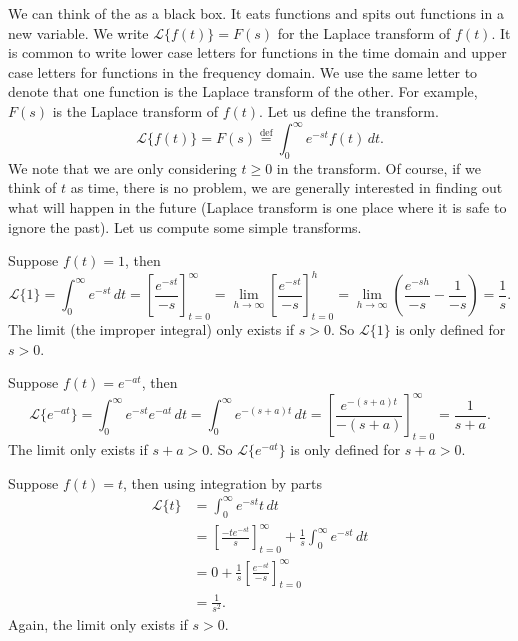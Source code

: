 We can think of the \emph{} as a black box.  It
eats functions and spits out functions in a new variable.  We write
$\mathcal{L} \bigl\{ f(t) \bigr\} = F(s)$ for the Laplace transform of $f(t)$.
It is common to write lower case letters for
functions in the time domain and upper case letters for functions in the
frequency domain.  We use the same letter to denote that one function
is the Laplace transform of the other.  For example, $F(s)$ is the Laplace
transform of $f(t)$.  Let us define the transform.
\begin{equation*}
\mathcal{L} \bigl\{ f(t) \bigr\} =
F(s) \overset{\text{def}}{=} \int_0^\infty e^{-st} f(t) \, dt .
\end{equation*}
We note that we are only considering $t \geq 0$ in the transform.  Of course,
if we think of $t$ as time, there is no problem, we are generally interested in
finding out what will happen in the future (Laplace transform is one place
where it is safe to ignore the past).  Let us compute some simple
transforms.

\begin{example}
Suppose $f(t) = 1$, then
\begin{equation*}
\mathcal{L} \{1\} = \int_0^\infty e^{-st} \, dt
=
\left[ \frac{e^{-st}}{-s} \right]_{t=0}^\infty
=
\lim_{h\to\infty}
\left[ \frac{e^{-st}}{-s} \right]_{t=0}^h
=
\lim_{h\to\infty}
\left( \frac{e^{-sh}}{-s} - \frac{1}{-s} \right)
= \frac{1}{s} .
\end{equation*}
The limit (the improper integral) only exists if $s > 0$.  So 
$\mathcal{L} \{1\}$ is only defined for $s > 0$.
\end{example}

\begin{example}
Suppose $f(t) = e^{-at}$, then
\begin{equation*}
\mathcal{L} \bigl\{e^{-at}\bigr\}
= \int_0^\infty e^{-st} e^{-at} \, dt
= \int_0^\infty e^{-(s+a)t} \, dt
=
\left[ \frac{e^{-(s+a)t}}{-(s+a)} \right]_{t=0}^\infty
= \frac{1}{s+a} .
\end{equation*}
The limit only exists if $s+a > 0$.  So 
$\mathcal{L} \bigl\{e^{-at}\bigr\}$ is only defined for $s+a > 0$.
\end{example}

\begin{example}
Suppose $f(t) = t$, then using integration by parts
\begin{equation*}
\begin{split}
\mathcal{L} \{t\}
& = \int_0^\infty e^{-st} t \, dt \\
& =
\left[ \frac{-te^{-st}}{s} \right]_{t=0}^\infty
+
\frac{1}{s}
\int_0^\infty e^{-st} \,dt \\
& =
0
+
\frac{1}{s}
\left[ \frac{e^{-st}}{-s} \right]_{t=0}^\infty \\
& =
\frac{1}{s^2} .
\end{split}
\end{equation*}
Again, the limit only exists if $s > 0$.
\end{example}

